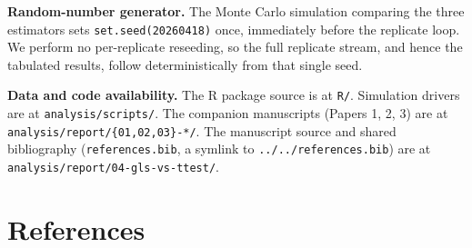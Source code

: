 \documentclass[
  11pt,
]{article}
\begin{document}
\textbf{Random-number generator.} The Monte Carlo simulation
comparing the three estimators sets \texttt{set.seed(20260418)}
once, immediately before the replicate loop. We perform
no per-replicate reseeding, so the full replicate
stream, and hence the tabulated results, follow
deterministically from that single seed.

\textbf{Data and code availability.} The R package source is at
\texttt{R/}. Simulation drivers are at \texttt{analysis/scripts/}. The
companion manuscripts (Papers 1, 2, 3) are at
\texttt{analysis/report/\{01,02,03\}-*/}. The manuscript source and
shared bibliography (\texttt{references.bib}, a symlink to
\texttt{../../references.bib}) are at
\texttt{analysis/report/04-gls-vs-ttest/}.

\section{References}\label{references}
\end{document}
